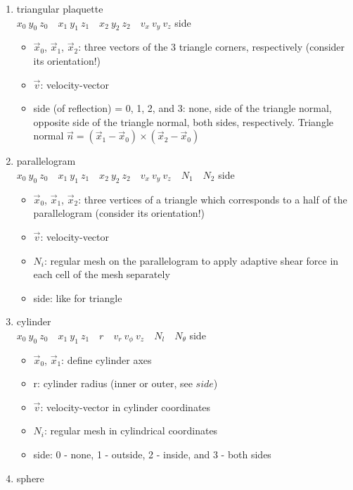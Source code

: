 \documentclass[a4paper,10pt]{scrreprt}
\begin{document}
\begin{enumerate}
	\begin{enumerate}
	\item triangular plaquette\\
		$ x_0\ y_0\ z_0\quad x_1\ y_1\ z_1\quad x_2\ y_2\ z_2\quad v_x\ v_y\ v_z$ { side}
		\begin{itemize}
	   	\item $\vec{x}_0$, $\vec{x}_1$, $\vec{x}_2$: three vectors of the 3 triangle corners, respectively (consider its orientation!)
	   	\item $\vec{v}$: velocity-vector
	   	\item side (of reflection) = 0, 1, 2, and 3: none, side of the triangle normal, opposite side of the triangle normal, both sides, respectively. Triangle normal $ \vec{n} = (\vec{x}_1 - \vec{x}_0) \times (\vec{x}_2 - \vec{x}_0)$
		\end{itemize}
	\item parallelogram\\
		$ x_0\ y_0\ z_0\quad x_1\ y_1\ z_1\quad x_2\ y_2\ z_2\quad v_x\ v_y\ v_z\quad N_1\quad N_2$ { side}
		\begin{itemize}
	   	\item $\vec{x}_0$, $\vec{x}_1$, $\vec{x}_2$: three vertices of a triangle which corresponds to a half of the parallelogram (consider its orientation!)
	   	\item $\vec{v}$: velocity-vector
	   	\item $ N_i$: regular mesh on the parallelogram to apply adaptive shear force in each cell of the mesh separately
	   	\item side: like for triangle
		\end{itemize}
	\item cylinder\\
		$ x_0\ y_0\ z_0\quad x_1\ y_1\ z_1\quad r \quad v_r\ v_{\phi}\ v_z\quad N_l\quad N_{\theta}$ { side}
		\begin{itemize}
	   	\item $\vec{x}_0$, $\vec{x}_1$: define cylinder axes
	   	\item r: cylinder radius (inner or outer, see $side$)
	   	\item $\vec{v}$: velocity-vector in cylinder coordinates
	   	\item $ N_i$: regular mesh in cylindrical coordinates
	   	\item side: 0 - none, 1 - outside, 2 - inside, and 3 - both sides
		\end{itemize}
	\item sphere\\

\end{enumerate}
\end{enumerate}
\end{document}

